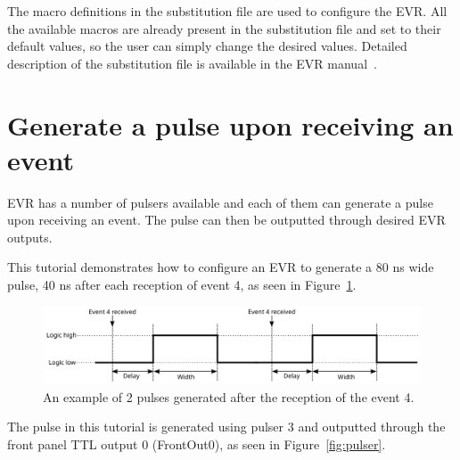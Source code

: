 \documentclass[12pt,a4paper]{article}
\begin{document}
The macro definitions in the substitution file are used to configure the EVR. All the available macros are already present in the substitution file and set to their default values, so the user can simply change the desired values. Detailed description of the substitution file is available in the EVR manual~\cite{evr_manual}.


\section{Generate a pulse upon receiving an event}
EVR has a number of pulsers available and each of them can generate a pulse upon receiving an event. The pulse can then be outputted through desired EVR outputs. 

This tutorial demonstrates how to configure an EVR to generate a 80 ns wide pulse, 40 ns after each reception of event 4, as seen in Figure~\ref{fig:pulser_signal}. 
\begin{figure}[H]
	\centering
	\includegraphics[width=\columnwidth]{./img/pulserSignal}
	\caption{An example of 2 pulses generated after the reception of the event 4.}
	\label{fig:pulser_signal}
\end{figure}
The pulse in this tutorial is generated using pulser 3 and outputted through the front panel TTL output 0 (FrontOut0), as seen in Figure~\ref{fig:pulser}. 
\end{document}
